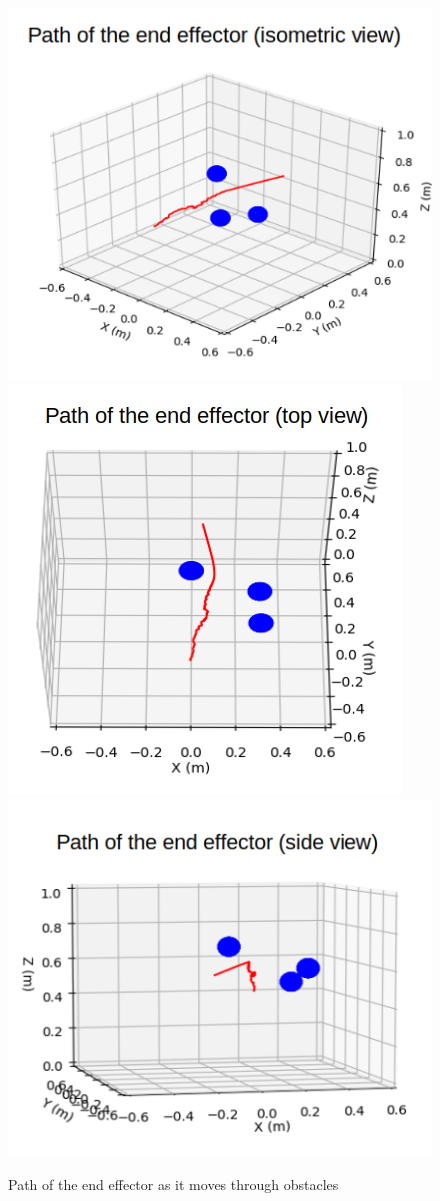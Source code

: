 \documentclass[a4paper, 10pt, conference]{ieeeconf}      %
\begin{document}
\begin{figure}[H]
	\centering
	\includegraphics[scale=0.30]{images/one_arm_three_obstacles.png}
	\includegraphics[scale=0.30]{images/one_arm_three_obstacles_top.png}
	\includegraphics[scale=0.30]{images/one_arm_three_obstacles_side.png}
	\caption{Path of the end effector as it moves through obstacles}
	\label{fig:one_arm_avoidance}
\end{figure}
\end{document}
